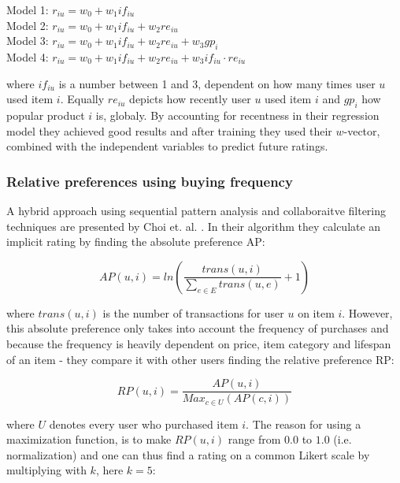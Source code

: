 \noindent
Model 1: $r_{iu} = w_0 + w_1 if_{iu}$ \\
Model 2: $r_{iu} = w_0 + w_1 if_{iu} + w_2 re_{iu}$ \\
Model 3: $r_{iu} = w_0 + w_1 if_{iu} + w_2 re_{iu} + w_3 gp_{i}$ \\
Model 4: $r_{iu} = w_0 + w_1 if_{iu} + w_2 re_{iu} + w_3 if_{iu} \cdot re_{iu}$

where $if_{iu}$ is a number between 1 and 3, dependent on how many times user
$u$ used item $i$. Equally $re_{iu}$ depicts how recently user $u$ used item
$i$ and $gp_{i}$ how popular product $i$ is, globaly. By accounting for
recentness in their regression model they achieved good results  and after
training they used their $w$-vector, combined with the independent variables to
predict future ratings. 

\subsubsection{Relative preferences using buying frequency}

A hybrid approach using sequential pattern analysis and collaboraitve filtering
techniques are presented by Choi et. al. \cite{choi2012hybrid}. In their
algorithm they calculate an implicit rating by finding the absolute preference
AP:

\begin{equation}
  AP(u,i) = ln(\frac{trans(u,i)}{\sum_{e \in E}{trans(u, e)}} + 1)
\end{equation}


where $trans(u,i)$ is the number of transactions for user $u$ on item $i$.
However, this absolute preference only takes into account the frequency of
purchases and because the frequency is heavily dependent on price, item
category and lifespan of an item - they compare it with other users finding the
relative preference RP:

\begin{equation}
  RP(u,i) = \frac{AP(u,i)}{Max_{c \in U}(AP(c,i))}
\end{equation}

where $U$ denotes every user who purchased item $i$. The reason for using a
maximization function, is to make $RP(u,i)$ range from $0.0$ to $1.0$ (i.e.
normalization) and one can thus find a rating on a common Likert scale by
multiplying with $k$, here $k=5$: 


